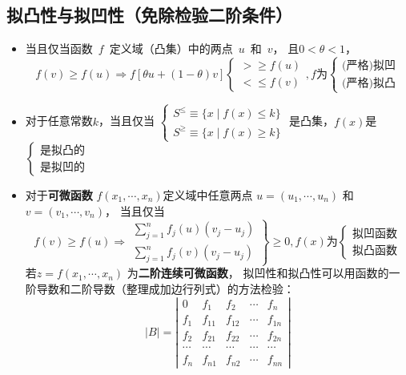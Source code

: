 \documentclass[12pt, a4paper, oneside]{article}
\begin{document}
\begin{CJK*}{UTF8}{gbsn}
\subsection{拟凸性与拟凹性（免除检验二阶条件）}
\begin{itemize}
	\item 
		当且仅当函数\ $f$\ 定义域（凸集）中的两点\ $u$\ 和\ $v$，
		且$0<\theta<1$，
		$$
		f(v) \geqslant f(u)
		\Longrightarrow
		f[\theta u+(1-\theta) v]
		\left\{\begin{array}{l} > \geqslant f(u) \\< \leqslant f(v)\end{array}\right.,
		f\text{为}
		\left\{\begin{array}{l}\text{(严格)拟凹} \\ \text{(严格)拟凸}\end{array}\right.
		$$
	\item 
		对于任意常数$k$，当且仅当
		$
		\left\{\begin{array}{l}
		S^{\leqslant} \equiv\{x \mid f(x) \leqslant k\} \\
		S^{\geqslant} \equiv\{x \mid f(x) \geqslant k\} 
		\end{array}\right.
		$
		是凸集，$f(x)$是
		$
		\left\{\begin{array}{l}
			\text{是拟凸的} \\
			\text{是拟凹的}
		\end{array}\right.
		$
	\item 
		对于\textbf{可微函数}
		$f\left(x_{1}, \cdots, x_{n}\right)$定义域中任意两点
		$u=\left(u_{1}, \cdots, u_{n}\right)$
		和$v=\left(v_{1}, \cdots, v_{n}\right)$，
		当且仅当
		$$
		f(v) \geqslant f(u) 
		\Rightarrow
		\left.
		\begin{array}{l}
			\sum_{j=1}^{n} f_{j}(u)\left(v_{j}-u_{j}\right) \\
			\sum_{j=1}^{n} f_{j}(v)\left(v_{j}-u_{j}\right)
		\end{array}
		\right\} 
		\geqslant 0,
		f(x)\text{为}
		\left\{\begin{array}{l}
			\text{拟凹函数} \\
			\text{拟凸函数}
		\end{array}\right.
		$$
		若$z=f\left(x_{1}, \cdots, x_{n}\right)$
		为\textbf{二阶连续可微函数}，
		拟凹性和拟凸性可以用函数的一阶导数和二阶导数（整理成加边行列式）的方法检验：
		$$
		|B|=\left|\begin{array}{ccccc}0 & f_{1} & f_{2} & \cdots & f_{n} \\ f_{1} & f_{11} & f_{12} & \cdots & f_{1 n} \\ f_{2} & f_{21} & f_{22} & \cdots & f_{2 n} \\ \cdots &\cdots &\cdots &\cdots &\cdots \\ f_{n} & f_{n 1} & f_{n 2} & \cdots & f_{n n}\end{array}\right|
$$
\end{itemize}
\end{CJK*}
\end{document}
